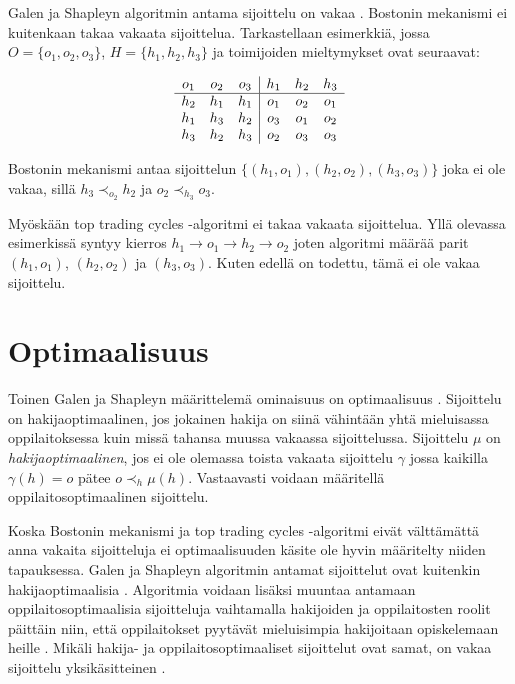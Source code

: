 \documentclass[gradu, twoside]{tktltiki}
\begin{document}
Galen ja Shapleyn algoritmin antama sijoittelu on vakaa
\cite{galeshapley62, gusfield89}. Bostonin mekanismi ei kuitenkaan
takaa vakaata sijoittelua. Tarkastellaan esimerkkiä, jossa $O = \{o_1,
o_2, o_3\}$, $H = \{h_1, h_2, h_3\}$ ja toimijoiden mieltymykset ovat
seuraavat:

\[
  \begin{array}{c c c}
    o_1 & o_2 & o_3 \\
    \hline
    h_2 & h_1 & h_1 \\
    h_1 & h_3 & h_2 \\
    h_3 & h_2 & h_3
  \end{array}
  \begin{array}{|c c c}
    h_1 & h_2 & h_3 \\
    \hline
    o_1 & o_2 & o_1 \\
    o_3 & o_1 & o_2 \\
    o_2 & o_3 & o_3
  \end{array}
\]

Bostonin mekanismi antaa sijoittelun $\{(h_1, o_1), (h_2, o_2), (h_3,
o_3)\}$ joka ei ole vakaa, sillä $h_3 \prec_{o_2} h_2$ ja $o_2
\prec_{h_3} o_3$.

Myöskään top trading cycles -algoritmi ei takaa vakaata sijoittelua.
Yllä olevassa esimerkissä syntyy kierros $h_1 \rightarrow o_1
\rightarrow h_2 \rightarrow o_2$ joten algoritmi määrää parit $(h_1,
o_1)$, $(h_2, o_2)$ ja $(h_3, o_3)$. Kuten edellä on todettu, tämä ei
ole vakaa sijoittelu.

\section{Optimaalisuus}

Toinen Galen ja Shapleyn määrittelemä ominaisuus on optimaalisuus
\cite{galeshapley62}. Sijoittelu on hakijaoptimaalinen, jos jokainen
hakija on siinä vähintään yhtä mieluisassa oppilaitoksessa kuin missä
tahansa muussa vakaassa sijoittelussa. Sijoittelu $\mu$ on
\emph{hakijaoptimaalinen}, jos ei ole olemassa toista vakaata
sijoittelu $\gamma$ jossa kaikilla $\gamma(h) = o$ pätee $o \prec_h
\mu(h)$. Vastaavasti voidaan määritellä oppilaitosoptimaalinen
sijoittelu.

Koska Bostonin mekanismi ja top trading cycles -algoritmi eivät
välttämättä anna vakaita sijoitteluja ei optimaalisuuden käsite ole
hyvin määritelty niiden tapauksessa. Galen ja Shapleyn algoritmin
antamat sijoittelut ovat kuitenkin hakijaoptimaalisia
\cite{galeshapley62}. Algoritmia voidaan lisäksi muuntaa antamaan
oppilaitosoptimaalisia sijoitteluja vaihtamalla hakijoiden ja
oppilaitosten roolit päittäin niin, että oppilaitokset pyytävät
mieluisimpia hakijoitaan opiskelemaan heille \cite{galeshapley62}.
Mikäli hakija- ja oppilaitosoptimaaliset sijoittelut ovat samat, on
vakaa sijoittelu yksikäsitteinen \cite{galeshapley62}.
\end{document}
